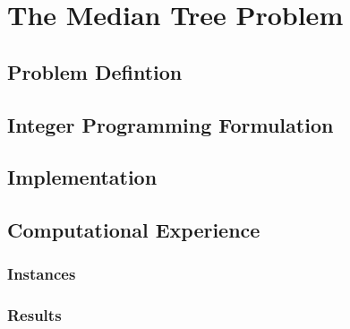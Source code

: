 
\chapter{The Median Tree Problem}
\label{chap:mediantree}

\section{Problem Defintion}

\section{Integer Programming Formulation}

\section{Implementation}

\section{Computational Experience}

\subsection{Instances}

\subsection{Results}


